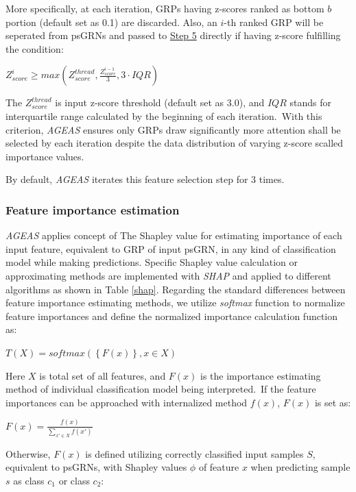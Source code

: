 \documentclass[fleqn,10pt]{wlscirep}
\begin{document}
    More specifically, at each iteration, GRPs having z-scores ranked as bottom $b$ portion (default set as 0.1) are discarded.
    Also, an $i$-th ranked GRP will be seperated from psGRNs and passed to \hyperref[step5]{Step 5} directly if having z-score fulfilling the condition:

    \centerline{
      $Z_{score}^{i} \ge max(Z_{score}^{thread}, \frac{Z_{score}^{i-1}}{3}, 3 \cdot IQR)$
    }

    \noindent The $Z_{score}^{thread}$ is input z-score threshold (default set as 3.0), and $IQR$ stands for interquartile range calculated by the beginning of each iteration.\
    With this criterion, \emph{AGEAS} ensures only GRPs draw significantly more attention shall be selected by each iteration despite the data distribution of varying z-score scalled importance values.

    By default, \emph{AGEAS} iterates this feature selection step for 3 times.

    \subsubsection*{Feature importance estimation}
      \label{features_importances}
      \emph{AGEAS} applies concept of The Shapley value\cite{roth_1988} for estimating importance of each input feature, equivalent to GRP of input psGRN, in any kind of classification model while making predictions.
      Specific Shapley value calculation or approximating methods are implemented with \emph{SHAP}\cite{lundberg2017unified} and applied to different algorithms as shown in Table \ref{shap}.
      Regarding the standard differences between feature importance estimating methods, we utilize \emph{softmax} function to normalize feature importances and define the normalized importance calculation function as:

      \centerline{$T(X) = softmax(\left\{ F(x) \right\}, x \in X)$}

      \noindent Here $X$ is total set of all features, and $F(x)$ is the importance estimating method of individual classification model being interpreted.\
      If the feature importances can be approached with internalized method $f(x)$, $F(x)$ is set as:

      \centerline{$F(x) = \frac{f(x)}{\sum_{x' \in X} f(x')}$}

      \noindent Otherwise, $F(x)$ is defined utilizing correctly classified input samples $S$, equivalent to psGRNs, with Shapley values $\phi$ of feature $x$ when predicting sample $s$ as class $c_1$ or class $c_2$:\
\end{document}
